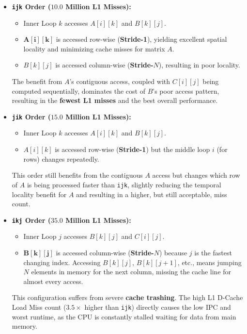 \documentclass[11pt, a4paper]{article}
\begin{document}
\begin{itemize}
    \item \textbf{\texttt{ijk} Order ($\mathbf{10.0}$ Million L1 Misses):}
    \begin{itemize}
        \item Inner Loop $k$ accesses $A[i][k]$ and $B[k][j]$.
        \item $\mathbf{A[i][k]}$ is accessed row-wise (\textbf{Stride-1}), yielding excellent spatial locality and minimizing cache misses for matrix $A$.
        \item $B[k][j]$ is accessed column-wise (\textbf{Stride-$N$}), resulting in poor locality.
    \end{itemize}
    The benefit from $A$'s contiguous access, coupled with $C[i][j]$ being computed sequentially, dominates the cost of $B$'s poor access pattern, resulting in the \textbf{fewest L1 misses} and the best overall performance.

    \item \textbf{\texttt{jik} Order ($\mathbf{15.0}$ Million L1 Misses):}
    \begin{itemize}
        \item Inner Loop $k$ accesses $A[i][k]$ and $B[k][j]$.
        \item $A[i][k]$ is accessed row-wise (\textbf{Stride-1}) but the middle loop $i$ (for rows) changes repeatedly.
    \end{itemize}
    This order still benefits from the contiguous $A$ access but changes which row of $A$ is being processed faster than \texttt{ijk}, slightly reducing the temporal locality benefit for $A$ and resulting in a higher, but still acceptable, miss count.

    \item \textbf{\texttt{ikj} Order ($\mathbf{35.0}$ Million L1 Misses):}
    \begin{itemize}
        \item Inner Loop $j$ accesses $B[k][j]$ and $C[i][j]$.
        \item $\mathbf{B[k][j]}$ is accessed column-wise (\textbf{Stride-$N$}) because $j$ is the fastest changing index. Accessing $B[k][j]$, $B[k][j+1]$, etc., means jumping $N$ elements in memory for the next column, missing the cache line for almost every access.
    \end{itemize}
    This configuration suffers from severe \textbf{cache trashing}. The high L1 D-Cache Load Miss count ($\mathbf{3.5\times}$ higher than \texttt{ijk}) directly causes the low IPC and worst runtime, as the CPU is constantly stalled waiting for data from main memory.
\end{itemize}
\end{document}
